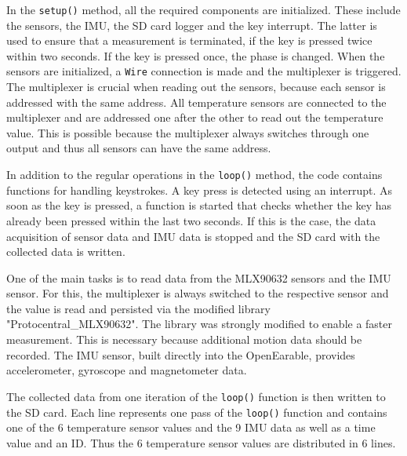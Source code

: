 In the \texttt{setup()} method, all the required components are initialized. These include the sensors, the IMU, the SD card logger and the key interrupt. The latter is used to ensure that a measurement is terminated, if the key is pressed twice within two seconds. 
If the key is pressed once, the phase is changed. 
When the sensors are initialized, a \texttt{Wire} connection is made and the multiplexer is triggered.
The multiplexer is crucial when reading out the sensors, because each sensor is addressed with the same address.
All temperature sensors are connected to the multiplexer and are addressed one after the other to read out the temperature value.
This is possible because the multiplexer always switches through one output and thus all sensors can have the same address.

In addition to the regular operations in the \texttt{loop()} method, the code contains functions for handling keystrokes. A key press is detected using an interrupt. As soon as the key is pressed, a function is started that checks whether the key has already been pressed within the last two seconds. If this is the case, the data acquisition of sensor data and IMU data is stopped and the SD card with the collected data is written.

One of the main tasks is to read data from the MLX90632 sensors and the IMU sensor. 
For this, the multiplexer is always switched to the respective sensor and the value is read and persisted via the modified library "Protocentral\_MLX90632".
The library was strongly modified to enable a faster measurement. 
This is necessary because additional motion data should be recorded.
The IMU sensor, built directly into the OpenEarable, provides accelerometer, gyroscope and magnetometer data.

The collected data from one iteration of the \texttt{loop()} function is then written to the SD card. Each line represents one pass of the \texttt{loop()} function and contains one of the 6 temperature sensor values and the 9 IMU data as well as a time value and an ID.
Thus the 6 temperature sensor values are distributed in 6 lines. 

